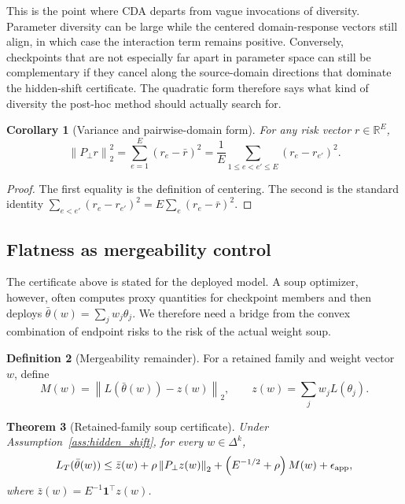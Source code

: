 \documentclass{article}
\newtheorem{theorem}{Theorem}[section]
\newtheorem{corollary}[theorem]{Corollary}
\theoremstyle{definition}
\newtheorem{definition}[theorem]{Definition}
\newcommand{\RR}{\mathbb{R}}
\newcommand{\simplex}{\Delta}
\newcommand{\one}{\mathbf{1}}
\newcommand{\norm}[1]{\left\lVert #1 \right\rVert}
\newcommand{\paren}[1]{\left( #1 \right)}
\newcommand{\thetaw}{\bar{\theta}(w)}
\begin{document}
This is the point where CDA departs from vague invocations of diversity. Parameter diversity can be large while the centered domain-response vectors still align, in which case the interaction term remains positive. Conversely, checkpoints that are not especially far apart in parameter space can still be complementary if they cancel along the source-domain directions that dominate the hidden-shift certificate. The quadratic form therefore says what kind of diversity the post-hoc method should actually search for.

\begin{corollary}[Variance and pairwise-domain form]
\label{cor:variance}
For any risk vector \(r\in\RR^E\),
\begin{equation}
\norm{P_\perp r}_2^2
=
\sum_{e=1}^E(r_e-\bar r)^2
=
\frac{1}{E}\sum_{1\le e<e'\le E}(r_e-r_{e'})^2.
\label{eq:variance_pairwise}
\end{equation}
\end{corollary}

\begin{proof}
The first equality is the definition of centering. The second is the standard identity
\(\sum_{e<e'}(r_e-r_{e'})^2=E\sum_e(r_e-\bar r)^2\).
\end{proof}

\subsection{Flatness as mergeability control}

The certificate above is stated for the deployed model. A soup optimizer, however, often computes proxy quantities for checkpoint members and then deploys \(\thetaw=\sum_jw_j\theta_j\). We therefore need a bridge from the convex combination of endpoint risks to the risk of the actual weight soup.

\begin{definition}[Mergeability remainder]
\label{def:mergeability}
For a retained family and weight vector \(w\), define
\[
M(w)=\norm{L(\thetaw)-z(w)}_2,
\qquad
z(w)=\sum_jw_jL(\theta_j).
\]
\end{definition}

\begin{theorem}[Retained-family soup certificate]
\label{thm:soup_certificate}
Under Assumption~\ref{ass:hidden_shift}, for every \(w\in\simplex^k\),
\begin{equation}
L_T(\thetaw)
\le
\bar z(w)
+\rho\norm{P_\perp z(w)}_2
+\paren{E^{-1/2}+\rho}M(w)
+\epsilon_{\rm app},
\label{eq:soup_certificate}
\end{equation}
where \(\bar z(w)=E^{-1}\one^\top z(w)\).
\end{theorem}
\end{document}
